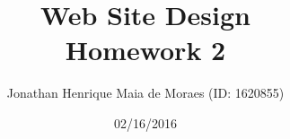 \title{Web Site Design \\ Homework 2}
\author{Jonathan Henrique Maia de Moraes (ID: 1620855)}
\date{02/16/2016}
\maketitle
